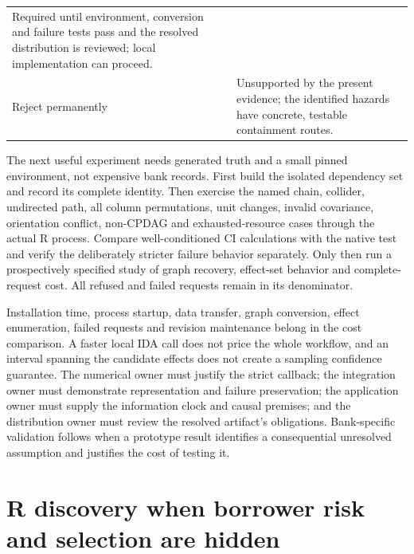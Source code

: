 \begin{longtable}[]{@{}ll@{}}
\begin{minipage}[t]{0.47\columnwidth}
Required until environment, conversion and failure tests pass and the
resolved distribution is reviewed; local implementation can
proceed.\strut
\end{minipage}\tabularnewline
\begin{minipage}[t]{0.47\columnwidth}\raggedright
Reject permanently\strut
\end{minipage} & \begin{minipage}[t]{0.47\columnwidth}\raggedright
Unsupported by the present evidence; the identified hazards have
concrete, testable containment routes.\strut
\end{minipage}\tabularnewline
\bottomrule
\end{longtable}

The next useful experiment needs generated truth and a small pinned
environment, not expensive bank records. First build the isolated
dependency set and record its complete identity. Then exercise the named
chain, collider, undirected path, all column permutations, unit changes,
invalid covariance, orientation conflict, non-CPDAG and
exhausted-resource cases through the actual R process. Compare
well-conditioned CI calculations with the native test and verify the
deliberately stricter failure behavior separately. Only then run a
prospectively specified study of graph recovery, effect-set behavior and
complete-request cost. All refused and failed requests remain in its
denominator.

Installation time, process startup, data transfer, graph conversion,
effect enumeration, failed requests and revision maintenance belong in
the cost comparison. A faster local IDA call does not price the whole
workflow, and an interval spanning the candidate effects does not create
a sampling confidence guarantee. The numerical owner must justify the
strict callback; the integration owner must demonstrate representation
and failure preservation; the application owner must supply the
information clock and causal premises; and the distribution owner must
review the resolved artifact's obligations. Bank-specific validation
follows when a prototype result identifies a consequential unresolved
assumption and justifies the cost of testing it.

\label{exec13:pcalg-reuse-end}


\section{R discovery when borrower risk and selection are hidden}
\label{exec13:latent-r}

